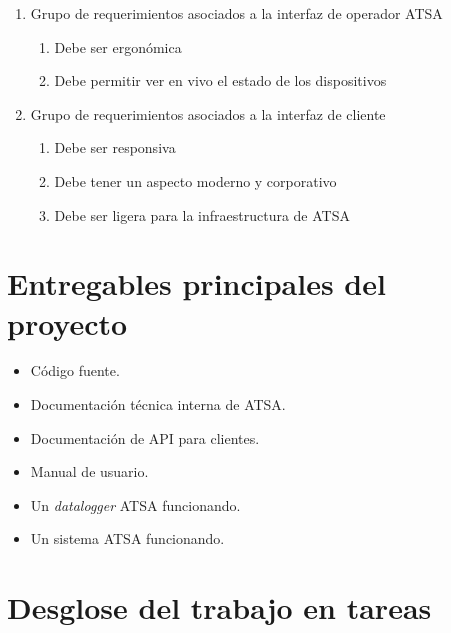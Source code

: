 \documentclass[
12pt,
spanish,
singlespacing,
parskip,
headsepline,]{article}
\begin{document}
\begin{enumerate}
	\item Grupo de requerimientos asociados a la interfaz de operador ATSA
		\begin{enumerate}
			\item Debe ser ergonómica
			\item Debe permitir ver en vivo el estado de los dispositivos
		\end{enumerate}
	\item Grupo de requerimientos asociados a la interfaz de cliente
		\begin{enumerate}
			\item Debe ser responsiva
			\item Debe tener un aspecto moderno y corporativo
			\item Debe ser ligera para la infraestructura de ATSA
		\end{enumerate}
\end{enumerate}

\section{Entregables principales del proyecto}

\begin{itemize}
	\item Código fuente. 
	\item Documentación técnica interna de ATSA.
	\item Documentación de API para clientes.
	\item Manual de usuario.
	\item Un \emph{datalogger} ATSA funcionando.
	\item Un sistema ATSA funcionando.
\end{itemize}

\section{Desglose del trabajo en tareas}
\end{document}
